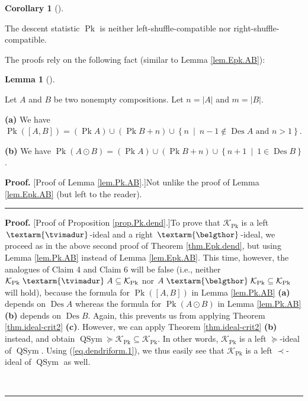 \documentclass[numbers=enddot,12pt,final,onecolumn,notitlepage]{scrartcl}%
\theoremstyle{definition}
\newtheorem{lem}[theo]{Lemma}
\newenvironment{lemma}[1][]
{\begin{lem}[#1]\begin{leftbar}}
{\end{leftbar}\end{lem}}
\newtheorem{coro}[theo]{Corollary}
\newenvironment{corollary}[1][]
{\begin{coro}[#1]\begin{leftbar}}
{\end{leftbar}\end{coro}}
\newenvironment{proof}[1][Proof]{\noindent\textbf{#1.} }{\ \rule{0.5em}{0.5em}}
\newenvironment{verlong}{}{}
\newcommand{\tvi}{\left. \textarm{\tvimadur} \right.}
\newcommand{\bel}{\left. \textarm{\belgthor} \right.}
\begin{document}
\begin{verlong}
\begin{corollary}
\label{cor.dendri.Pk}The descent statistic $\operatorname*{Pk}$ is neither
left-shuffle-compatible nor right-shuffle-compatible.
\end{corollary}

The proofs rely on the following fact (similar to Lemma \ref{lem.Epk.AB}):

\begin{lemma}
\label{lem.Pk.AB}Let $A$ and $B$ be two nonempty compositions. Let
$n=\left\vert A\right\vert $ and $m=\left\vert B\right\vert $.

\textbf{(a)} We have $\operatorname*{Pk}\left(  \left[  A,B\right]  \right)
=\left(  \operatorname*{Pk}A\right)  \cup\left(  \operatorname*{Pk}B+n\right)
\cup\left\{  n\ \mid\ n-1\notin\operatorname*{Des}A\text{ and }n>1\right\}  $.

\textbf{(b)} We have $\operatorname*{Pk}\left(  A\odot B\right)  =\left(
\operatorname*{Pk}A\right)  \cup\left(  \operatorname*{Pk}B+n\right)
\cup\left\{  n+1\ \mid\ 1\in\operatorname*{Des}B\right\}  $.
\end{lemma}

\begin{proof}
[Proof of Lemma \ref{lem.Pk.AB}.]Not unlike the proof of Lemma
\ref{lem.Epk.AB} (but left to the reader).
\end{proof}

\begin{proof}
[Proof of Proposition \ref{prop.Pk.dend}.]To prove that $\mathcal{K}%
_{\operatorname*{Pk}}$ is a left $\tvi$-ideal and a right $\bel$-ideal, we
proceed as in the above second proof of Theorem \ref{thm.Epk.dend}, but using
Lemma \ref{lem.Pk.AB} instead of Lemma \ref{lem.Epk.AB}. This time, however,
the analogues of Claim 4 and Claim 6 will be false (i.e., neither
$\mathcal{K}_{\operatorname*{Pk}}\tvi A\subseteq\mathcal{K}%
_{\operatorname*{Pk}}$ nor $A\bel\mathcal{K}_{\operatorname*{Pk}}%
\subseteq\mathcal{K}_{\operatorname*{Pk}}$ will hold), because the formula for
$\operatorname*{Pk}\left(  \left[  A,B\right]  \right)  $ in Lemma
\ref{lem.Pk.AB} \textbf{(a)} depends on $\operatorname*{Des}A$ whereas the
formula for $\operatorname*{Pk}\left(  A\odot B\right)  $ in Lemma
\ref{lem.Pk.AB} \textbf{(b)} depends on $\operatorname*{Des}B$. Again, this
prevents us from applying Theorem \ref{thm.ideal-crit2} \textbf{(c)}. However,
we can apply Theorem \ref{thm.ideal-crit2} \textbf{(b)} instead, and obtain
$\operatorname*{QSym}\left.  \succeq\right.  \mathcal{K}_{\operatorname*{Pk}%
}\subseteq\mathcal{K}_{\operatorname*{Pk}}$. In other words, $\mathcal{K}%
_{\operatorname*{Pk}}$ is a left $\left.  \succeq\right.  $-ideal of
$\operatorname*{QSym}$. Using (\ref{eq.dendriform.1}), we thus easily see that
$\mathcal{K}_{\operatorname*{Pk}}$ is a left $\left.  \prec\right.  $-ideal of
$\operatorname*{QSym}$ as well.


\end{proof}
\end{verlong}
\end{document}
